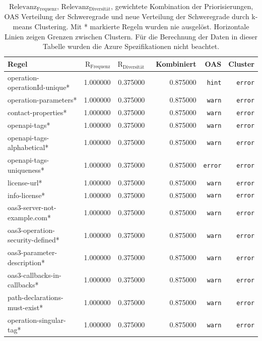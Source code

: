 \newpage
{\footnotesize
\begin{longtable}{lrrrrr}
  \caption{\normalsize $\text{Relevanz}_\text{Frequenz}$, $\text{Relevanz}_\text{Diversität}$, gewichtete Kombination der Priorisierungen, OAS Verteilung der Schweregrade und neue Verteilung der Schweregrade durch k-means Clustering. Mit * markierte Regeln wurden nie ausgelöst. Horizontale Linien zeigen Grenzen zwischen Clustern. Für die Berechnung der Daten in dieser Tabelle wurden die Azure Spezifikationen nicht beachtet.}
  \label{tab:combinedweighedpriononazure}
  \endfirsthead
  \endhead
  \textbf{Regel} & \textbf{$\text{R}_\text{Frequenz}$} & \textbf{$\text{R}_\text{Diversität}$} & \ \textbf{Kombiniert} & \textbf{OAS} & \textbf{Cluster} \\ \hline \hline
operation-operationId-unique* & 1.000000 &  0.375000 & 0.875000 & \texttt{hint} & \texttt{error} \\
operation-parameters* & 1.000000 &  0.375000 & 0.875000 & \texttt{warn} & \texttt{error} \\
contact-properties* & 1.000000 &  0.375000 & 0.875000 & \texttt{warn} & \texttt{error} \\
openapi-tags* & 1.000000 &  0.375000 & 0.875000 & \texttt{warn} & \texttt{error} \\
openapi-tags-alphabetical* &  1.000000 &  0.375000 & 0.875000 & \texttt{warn} & \texttt{error} \\
openapi-tags-uniqueness* &  1.000000 &  0.375000 & 0.875000 & \texttt{error} & \texttt{error} \\
license-url* &  1.000000 &  0.375000 & 0.875000 & \texttt{warn} & \texttt{error} \\
info-license* & 1.000000 &  0.375000 & 0.875000 & \texttt{warn} & \texttt{error} \\
oas3-server-not-example.com* &  1.000000 &  0.375000 & 0.875000 & \texttt{warn} & \texttt{error} \\
oas3-operation-security-defined* &  1.000000 &  0.375000 & 0.875000 & \texttt{warn} & \texttt{error} \\
oas3-parameter-description* & 1.000000 &  0.375000 & 0.875000 & \texttt{warn} & \texttt{error} \\
oas3-callbacks-in-callbacks* &  1.000000 &  0.375000 & 0.875000 & \texttt{warn} & \texttt{error} \\
path-declarations-must-exist* & 1.000000 &  0.375000 & 0.875000 & \texttt{warn} & \texttt{error} \\
operation-singular-tag* & 1.000000 &  0.375000 & 0.875000 & \texttt{warn} & \texttt{error} \\

\end{longtable}}
